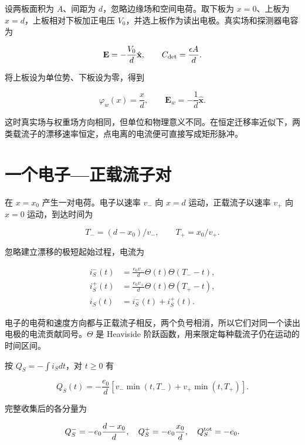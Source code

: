 \documentclass[
  11pt,
  a4paper,
  oneside,
  openany]{report}
\numberwithin{equation}{chapter}
\begin{document}
设两板面积为 \(A\)、间距为 \(d\)，忽略边缘场和空间电荷。取下板为
\(x=0\)、上板为 \(x=d\)，上板相对下板加正电压
\(V_0\)，并选上板作为读出电极。真实场和探测器电容为

\begin{equation}
\mathbf E=-\frac{V_0}{d}\hat{\mathbf x},\qquad
C_{\rm det}=\frac{\epsilon A}{d}.
\end{equation}

将上板设为单位势、下板设为零，得到

\begin{equation}
\varphi_w(x)=\frac{x}{d},\qquad
\mathbf E_w=-\frac1d\hat{\mathbf x}.
\end{equation}

这时真实场与权重场方向相同，但单位和物理意义不同。在恒定迁移率近似下，两类载流子的漂移速率恒定，点电离的电流便可直接写成矩形脉冲。

\section{一个电子---正载流子对}\label{ux4e00ux4e2aux7535ux5b50ux6b63ux8f7dux6d41ux5b50ux5bf9}

在 \(x=x_0\) 产生一对电荷。电子以速率 \(v_-\) 向 \(x=d\)
运动，正载流子以速率 \(v_+\) 向 \(x=0\) 运动，到达时间为

\begin{equation}
T_-=(d-x_0)/v_-,\qquad T_+=x_0/v_+.
\end{equation}

忽略建立漂移的极短起始过程，电流为

\begin{align}
i_S^-(t)&=\frac{e_0v_-}{d}\Theta(t)\Theta(T_--t),\\
i_S^+(t)&=\frac{e_0v_+}{d}\Theta(t)\Theta(T_+-t),\\
i_S(t)&=i_S^-(t)+i_S^+(t).
\end{align}

电子的电荷和速度方向都与正载流子相反，两个负号相消，所以它们对同一个读出电极的电流贡献同号。\(\Theta\)
是 Heaviside 阶跃函数，用来限定每种载流子仍在运动的时间区间。

按 \(Q_S=-\int i_Sdt\)，对 \(t\ge0\) 有

\begin{equation}
Q_S(t)=-\frac{e_0}{d}
\left[v_-\min(t,T_-)+v_+\min(t,T_+)\right].
\end{equation}

完整收集后的各分量为

\begin{equation}
Q_S^-=-e_0\frac{d-x_0}{d},\quad
Q_S^+=-e_0\frac{x_0}{d},\quad Q_S^{\rm tot}=-e_0.
\label{eq:plate-total}
\end{equation}
\end{document}
